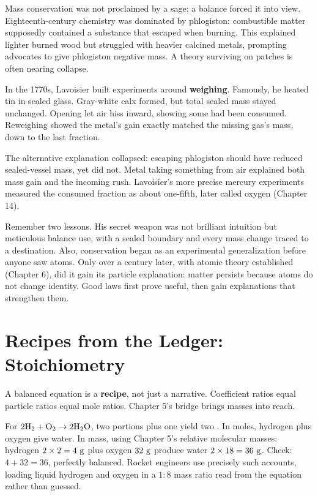 \begin{zhengju}
Mass conservation was not proclaimed by a sage; a balance forced it into view. Eighteenth-century chemistry was dominated by phlogiston: combustible matter supposedly contained a substance that escaped when burning. This explained lighter burned wood but struggled with heavier calcined metals, prompting advocates to give phlogiston negative mass. A theory surviving on patches is often nearing collapse.

In the 1770s, Lavoisier built experiments around \textbf{weighing}. Famously, he heated tin in sealed glass. Gray-white calx formed, but total sealed mass stayed unchanged. Opening let air hiss inward, showing some had been consumed. Reweighing showed the metal's gain exactly matched the missing gas's mass, down to the last fraction.

The alternative explanation collapsed: escaping phlogiston should have reduced sealed-vessel mass, yet did not. Metal taking something from air explained both mass gain and the incoming rush. Lavoisier's more precise mercury experiments measured the consumed fraction as about one-fifth, later called oxygen (Chapter 14).

Remember two lessons. His secret weapon was not brilliant intuition but meticulous balance use, with a sealed boundary and every mass change traced to a destination. Also, conservation began as an experimental generalization before anyone saw atoms. Only over a century later, with atomic theory established (Chapter 6), did it gain its particle explanation: matter persists because atoms do not change identity. Good laws first prove useful, then gain explanations that strengthen them.
\end{zhengju}

\section{Recipes from the Ledger: Stoichiometry}

A balanced equation is a \textbf{recipe}, not just a narrative. Coefficient ratios equal particle ratios equal mole ratios. Chapter 5's bridge brings masses into reach.

\begin{qiaoliang}
For $\mathrm{2H_2} + \mathrm{O_2} \rightarrow \mathrm{2H_2O}$, two portions  plus one  yield two . In moles,  hydrogen plus  oxygen give  water. In mass, using Chapter 5's relative molecular masses: hydrogen $2\times 2=4\ \mathrm{g}$ plus oxygen $32\ \mathrm{g}$ produce water $2\times 18=36\ \mathrm{g}$. Check: $4+32=36$, perfectly balanced. Rocket engineers use precisely such accounts, loading liquid hydrogen and oxygen in a $1:8$ mass ratio read from the equation rather than guessed.
\end{qiaoliang}

